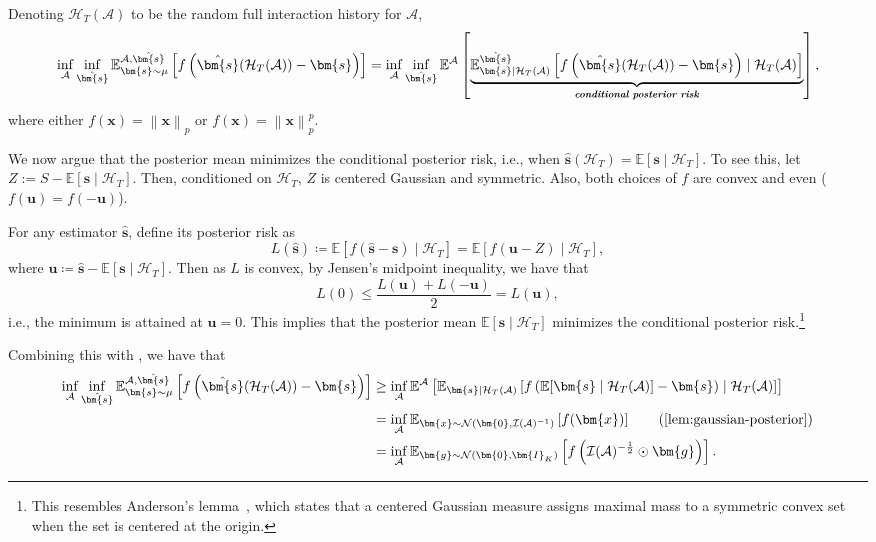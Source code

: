 \documentclass{article}
\def\vzero{{\bm{0}}}
\def\vg{{\bm{g}}}
\def\vs{{\bm{s}}}
\def\vu{{\bm{u}}}
\def\vx{{\bm{x}}}
\def\mI{{\bm{I}}}
\def\gA{{\mathcal{A}}}
\def\gH{{\mathcal{H}}}
\def\gI{{\mathcal{I}}}
\def\gN{{\mathcal{N}}}
\newcommand{\E}{\mathbb{E}}
\theoremstyle{plain}
\theoremstyle{definition}
\theoremstyle{plain}
\newcommand{\bignorm}[1]{\left\lVert #1 \right\rVert}
\begin{document}
Denoting $\gH_T(\gA)$ to be the random full interaction history for $\gA$,
\begin{align}
    \inf_\gA \inf_{\hat{\vs}} \E_{\vs \sim \mu}^{\gA, \hat{\vs}}\left[ f\left( \hat{\vs}(\gH_T(\gA)) - \vs \right) \right] = \inf_\gA \inf_{\hat{\vs}} \E^\gA\left[ \underbrace{\E_{\vs \mid \gH_T(\gA)}^{\hat{\vs}} \left[ f\left( \hat{\vs}(\gH_T(\gA)) - \vs \right) \mid \gH_T(\gA) \right]}_{\textbf{\textit{conditional posterior risk}}} \right],
\end{align}
where either $f(\vx) = \bignorm{\vx}_p$ or $f(\vx) = \bignorm{\vx}_p^p$.

We now argue that the posterior mean minimizes the conditional posterior risk, i.e., when $\hat{\vs}(\gH_T) = \E[\vs \mid \gH_T]$.
To see this, let $Z := S - \E[\vs \mid \gH_T]$.
Then, conditioned on $\gH_T$, $Z$ is centered Gaussian and symmetric.
Also, both choices of $f$ are convex and even ($f(\vu) = f(-\vu)$).

For any estimator $\hat{\vs}$, define its posterior risk as
\begin{equation}
    L(\hat{\vs}) \coloneq \E[f(\hat{\vs} - \vs) \mid \gH_T] = \E[f(\vu - Z) \mid \gH_T],
\end{equation}
where $\vu \coloneq \hat{\vs} - \E[\vs \mid \gH_T]$.
Then as $L$ is convex, by Jensen's midpoint inequality, we have that
\begin{equation}
    L(0) \leq \frac{L(\vu) + L(-\vu)}{2} = L(\vu),
\end{equation}
i.e., the minimum is attained at $\vu = 0$.
This implies that the posterior mean $\E[\vs \mid \gH_T]$ minimizes the conditional posterior risk.\footnote{This resembles Anderson's lemma~\citep{anderson1955}, which states that a centered Gaussian measure assigns maximal mass to a symmetric convex set when the set is centered at the origin.}

Combining this with , we have that
\begin{align}
    \inf_\gA \inf_{\hat{\vs}} \E_{\vs \sim \mu}^{\gA, \hat{\vs}}\left[ f\left( \hat{\vs}(\gH_T(\gA)) - \vs \right) \right] &\geq \inf_\gA \E^\gA\left[ \E_{\vs \mid \gH_T(\gA)} \left[ f\left( \E[\vs \mid \gH_T(\gA)] - \vs \right) \mid \gH_T(\gA) \right] \right] \\
    &= \inf_\gA \E_{\vx \sim \gN(\vzero, \gI(\gA)^{-1})}\left[ f(\vx) \right] \tag{\Cref{lem:gaussian-posterior}} \\
    &= \inf_\gA \E_{\vg \sim \gN(\vzero, \mI_K)}\left[ f\left( \gI(\gA)^{-\frac{1}{2}} \odot \vg \right) \right].
\end{align}
\end{document}

